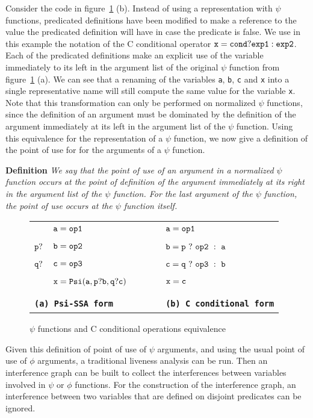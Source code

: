 Consider the code in figure~\ref{fig:psi_ccond} (b). Instead of using
a representation with $\psi$ functions, predicated definitions have
been modified to make a reference to the value the predicated
definition will have in case the predicate is false. We use in this
example the notation of the C conditional operator ${\tt x = cond ?
  exp1 : exp2}$. Each of the predicated definitions make an explicit
use of the variable immediately to its left in the argument list of
the original $\psi$ function from figure~\ref{fig:psi_ccond} (a). We
can see that a renaming of the variables {\tt a}, {\tt b}, {\tt c} and
{\tt x} into a single representative name will still compute the same
value for the variable {\tt x}. Note that this transformation can only
be performed on normalized $\psi$ functions, since the definition of
an argument must be dominated by the definition of the argument
immediately at its left in the argument list of the $\psi$
function. Using this equivalence for the representation of a $\psi$
function, we now give a definition of the point of use for for the
arguments of a $\psi$ function.

{\bf Definition} {\em We say that the point of use of an argument in a
  normalized $\psi$ function occurs at the point of definition of the
  argument immediately at its right in the argument list of the $\psi$
  function. For the last argument of the $\psi$ function, the point of
  use occurs at the $\psi$ function itself. }

\begin{figure}
\begin{center}
\footnotesize
\begin{tabular}{llll}
           & ${\tt a = op1}$ & \ \ \ \ & ${\tt a = op1}$ \\
${\tt p?}$ & ${\tt b = op2}$ & \ \ \ \ & ${\tt b = p\ ?\ op2\ :\ a}$ \\
${\tt q?}$ & ${\tt c = op3}$ & \ \ \ \ & ${\tt c = q\ ?\ op3\ :\ b}$ \\
           & ${\tt x = Psi(a,p?b,q?c)}$ & \ \ \ \ & ${\tt x = c}$ \\
\\
\multicolumn{2}{l}{\tt {\bf (a) Psi-SSA form}} & \ \ \ \ & {\tt {\bf (b) C conditional form}}
\end{tabular}
\caption{$\psi$ functions and C conditional operations equivalence}
\label{fig:psi_ccond}
\end{center}
\end{figure}

Given this definition of point of use of $\psi$ arguments, and using
the usual point of use of $\phi$ arguments, a traditional liveness
analysis can be run. Then an interference graph can be built to
collect the interferences between variables involved in $\psi$ or
$\phi$ functions. For the construction of the interference graph, an
interference between two variables that are defined on disjoint
predicates can be ignored.


